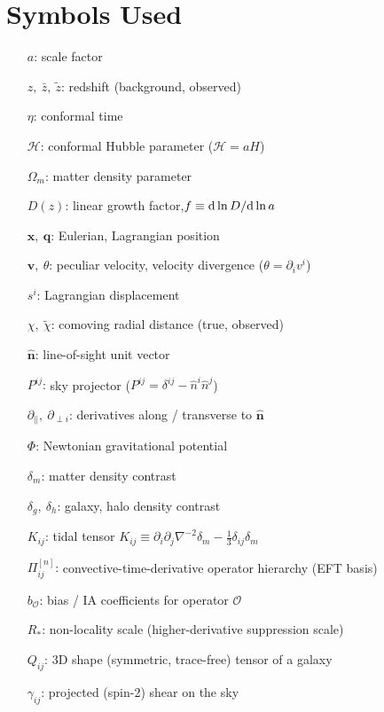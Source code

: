 \documentclass[11pt]{article}
\DeclareRobustCommand{\d}{\ifmmode\text{d}\else d\fi}
\newcommand{\Rstar}{R_\ast}
\begin{document}
\section*{Symbols Used}
\small
\begin{itemize}
    \item[$a$:] scale factor
    \item[$z,\ \bar z,\ \tilde z$:] redshift (background, observed)
    \item[$\eta$:] conformal time
    \item[$\mathcal H$:] conformal Hubble parameter ($\mathcal H=aH$)
    \item[$\Omega_m$:] matter density parameter
    \item[$D(z)$:] linear growth factor,\quad $f \equiv \d\ln D/\d\ln a$
    \item[$\mathbf x,\ \mathbf q$:] Eulerian, Lagrangian position
    \item[$\mathbf v,\ \theta$:] peculiar velocity, velocity divergence ($\theta=\partial_i v^i$)
    \item[$s^i$:] Lagrangian displacement
    \item[$\chi,\ \tilde\chi$:] comoving radial distance (true, observed)
    \item[$\hat{\mathbf n}$:] line-of-sight unit vector
    \item[$P^{ij}$:] sky projector ($P^{ij}=\delta^{ij}-\hat n^i\hat n^j$)
    \item[$\partial_\parallel,\ \partial_{\perp i}$:] derivatives along / transverse to $\hat{\mathbf n}$
    \item[$\Phi$:] Newtonian gravitational potential
    \item[$\delta_m$:] matter density contrast
    \item[$\delta_g,\ \delta_h$:] galaxy, halo density contrast
    \item[$K_{ij}$:] tidal tensor $K_{ij}\equiv \partial_i\partial_j\nabla^{-2}\delta_m-\tfrac13\delta_{ij}\delta_m$
    \item[$\Pi^{[n]}_{ij}$:] convective-time-derivative operator hierarchy (EFT basis)
    \item[$b_{\mathcal O}$:] bias / IA coefficients for operator $\mathcal O$
    \item[$\Rstar$:] non-locality scale (higher-derivative suppression scale)
    \item[$Q_{ij}$:] 3D shape (symmetric, trace-free) tensor of a galaxy
    \item[$\gamma_{ij}$:] projected (spin-2) shear on the sky

\end{itemize}
\end{document}
